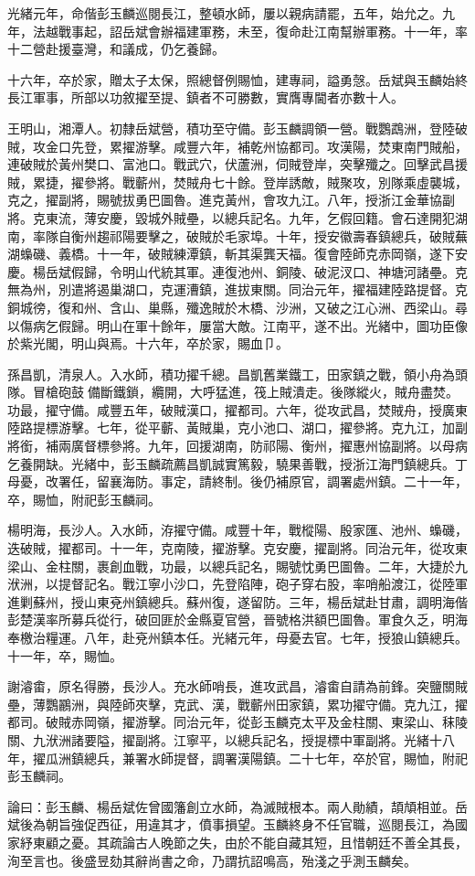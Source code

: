 \begin{pinyinscope}
光緒元年，命偕彭玉麟巡閱長江，整頓水師，屢以親病請罷，五年，始允之。九年，法越戰事起，詔岳斌會辦福建軍務，未至，復命赴江南幫辦軍務。十一年，率十二營赴援臺灣，和議成，仍乞養歸。

十六年，卒於家，贈太子太保，照總督例賜恤，建專祠，謚勇愨。岳斌與玉麟始終長江軍事，所部以功敘擢至提、鎮者不可勝數，實膺專閫者亦數十人。

王明山，湘潭人。初隸岳斌營，積功至守備。彭玉麟調領一營。戰鸚鵡洲，登陸破賊，攻金口先登，累擢游擊。咸豐六年，補乾州協都司。攻漢陽，焚東南門賊船，連破賊於黃州樊口、富池口。戰武穴，伏蘆洲，伺賊登岸，突擊殲之。回擊武昌援賊，累捷，擢參將。戰蘄州，焚賊舟七十餘。登岸誘敵，賊聚攻，別隊乘虛襲城，克之，擢副將，賜號拔勇巴圖魯。進克黃州，會攻九江。八年，授浙江金華協副將。克東流，薄安慶，毀城外賊壘，以總兵記名。九年，乞假回籍。會石達開犯湖南，率隊自衡州趨祁陽要擊之，破賊於毛家埠。十年，授安徽壽春鎮總兵，破賊蕪湖蟂磯、義橋。十一年，破賊練潭鎮，斬其渠龔天福。復會陸師克赤岡嶺，遂下安慶。楊岳斌假歸，令明山代統其軍。連復池州、銅陵、破泥汊口、神塘河諸壘。克無為州，別遣將遏巢湖口，克運漕鎮，進拔東關。同治元年，擢福建陸路提督。克銅城徬，復和州、含山、巢縣，殲逸賊於木橋、沙洲，又破之江心洲、西梁山。尋以傷病乞假歸。明山在軍十餘年，屢當大敵。江南平，遂不出。光緒中，圖功臣像於紫光閣，明山與焉。十六年，卒於家，賜血⼙。

孫昌凱，清泉人。入水師，積功擢千總。昌凱舊業鐵工，田家鎮之戰，領小舟為頭隊。冒槍砲鼓備斷鐵鎖，纜開，大呼猛進，筏上賊潰走。後隊縱火，賊舟盡焚。功最，擢守備。咸豐五年，破賊漢口，擢都司。六年，從攻武昌，焚賊舟，授廣東陸路提標游擊。七年，從平蘄、黃賊巢，克小池口、湖口，擢參將。克九江，加副將銜，補兩廣督標參將。九年，回援湖南，防祁陽、衡州，擢惠州協副將。以母病乞養開缺。光緒中，彭玉麟疏薦昌凱誠實篤毅，驍果善戰，授浙江海門鎮總兵。丁母憂，改署任，留襄海防。事定，請終制。後仍補原官，調署處州鎮。二十一年，卒，賜恤，附祀彭玉麟祠。

楊明海，長沙人。入水師，洊擢守備。咸豐十年，戰樅陽、殷家匯、池州、蟂磯，迭破賊，擢都司。十一年，克南陵，擢游擊。克安慶，擢副將。同治元年，從攻東梁山、金柱關，裹創血戰，功最，以總兵記名，賜號忱勇巴圖魯。二年，大捷於九洑洲，以提督記名。戰江寧小沙口，先登陷陣，砲子穿右股，率哨船渡江，從陸軍進剿蘇州，授山東兗州鎮總兵。蘇州復，遂留防。三年，楊岳斌赴甘肅，調明海偕彭楚漢率所募兵從行，破回匪於金縣夏官營，晉號格洪額巴圖魯。軍食久乏，明海奉檄治糧運。八年，赴兗州鎮本任。光緒元年，母憂去官。七年，授狼山鎮總兵。十一年，卒，賜恤。

謝濬畬，原名得勝，長沙人。充水師哨長，進攻武昌，濬畬自請為前鋒。突鹽關賊壘，薄鸚鸝洲，與陸師夾擊，克武、漢，戰蘄州田家鎮，累功擢守備。克九江，擢都司。破賊赤岡嶺，擢游擊。同治元年，從彭玉麟克太平及金柱關、東梁山、秣陵關、九洑洲諸要隘，擢副將。江寧平，以總兵記名，授提標中軍副將。光緒十八年，擢瓜洲鎮總兵，兼署水師提督，調署漢陽鎮。二十七年，卒於官，賜恤，附祀彭玉麟祠。

論曰：彭玉麟、楊岳斌佐曾國籓創立水師，為滅賊根本。兩人勛績，頡頏相並。岳斌後為朝旨強促西征，用違其才，僨事損望。玉麟終身不任官職，巡閱長江，為國家紓東顧之憂。其疏論古人晚節之失，由於不能自藏其短，且惜朝廷不善全其長，洵至言也。後盛昱劾其辭尚書之命，乃謂抗詔鳴高，殆淺之乎測玉麟矣。


\end{pinyinscope}